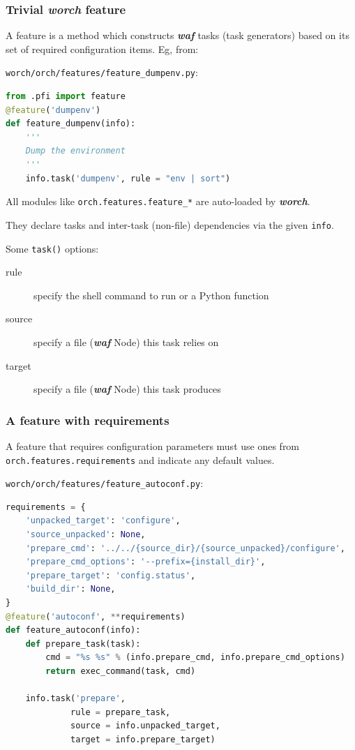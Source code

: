\documentclass[xcolor=dvipsnames]{beamer}
\newcommand{\app}[1]{\textbf{\textit{#1}}\xspace}
\def\waf{\app{waf}}
\def\worch{\app{worch}}
\begin{document}
\begin{frame}[fragile]
  \frametitle{Trivial \worch feature} 

  A feature is a method which constructs \waf tasks (task generators)
  based on its set of required configuration items.  Eg, from:

  \verb|worch/orch/features/feature_dumpenv.py|:
  \begin{lstlisting}[language=Python]
from .pfi import feature
@feature('dumpenv')
def feature_dumpenv(info):
    '''
    Dump the environment
    '''
    info.task('dumpenv', rule = "env | sort")
  \end{lstlisting}

  All modules like \verb|orch.features.feature_*| are auto-loaded by \worch.

  They declare tasks and inter-task (non-file) dependencies via the given \texttt{info}.

  Some \verb|task()| options:
  \begin{description}
  \item[rule] specify the shell command to run or a Python function
  \item[source] specify a file (\waf Node) this task relies on
  \item[target] specify a file (\waf Node) this task produces
  \end{description}

\end{frame}

\begin{frame}[fragile]
  \frametitle{A feature with requirements}

  A feature that requires configuration parameters must use ones from
  \texttt{orch.features.requirements} and indicate any default values.

  \verb|worch/orch/features/feature_autoconf.py|:
  \begin{lstlisting}[language=Python,basicstyle=\footnotesize\tiny,]
requirements = {
    'unpacked_target': 'configure',
    'source_unpacked': None,
    'prepare_cmd': '../../{source_dir}/{source_unpacked}/configure',
    'prepare_cmd_options': '--prefix={install_dir}',
    'prepare_target': 'config.status',
    'build_dir': None,
}
@feature('autoconf', **requirements)
def feature_autoconf(info):
    def prepare_task(task):
        cmd = "%s %s" % (info.prepare_cmd, info.prepare_cmd_options)
        return exec_command(task, cmd)
        
    info.task('prepare',
             rule = prepare_task,
             source = info.unpacked_target,
             target = info.prepare_target)
  \end{lstlisting}

\end{frame}
\end{document}
